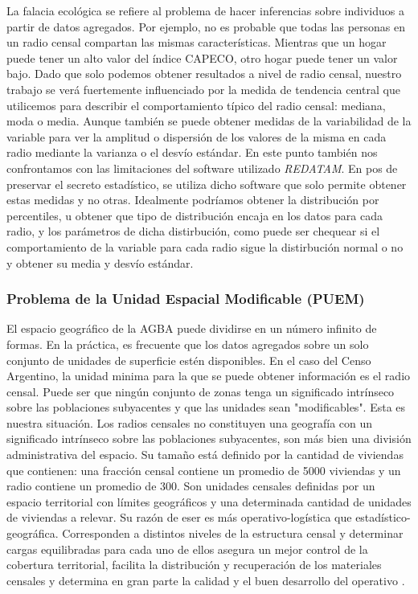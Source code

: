 La falacia ecológica se refiere al problema de hacer inferencias sobre individuos a partir de datos agregados. Por ejemplo, no es probable que todas las personas en un radio censal compartan las mismas características. Mientras que un hogar puede tener un alto valor del índice CAPECO, otro hogar puede tener un valor bajo. Dado que solo podemos obtener resultados a nivel de radio censal, nuestro trabajo se verá fuertemente influenciado por la medida de tendencia central que utilicemos para describir el comportamiento típico del radio censal: mediana, moda o media. Aunque también se puede obtener medidas de la variabilidad de la variable para ver la amplitud o dispersión de los valores de la misma en cada radio mediante la varianza o el desvío estándar. En este punto también nos confrontamos con las limitaciones del software utilizado \textit{REDATAM}. En pos de preservar el secreto estadístico, se utiliza dicho software que solo permite obtener estas medidas y no otras. Idealmente podríamos obtener la distribución por percentiles, u obtener que tipo de distribución encaja en los datos para cada radio, y los parámetros de dicha distirbución, como puede ser chequear si el comportamiento de la variable para cada radio sigue la distirbución normal o no y obtener su media y desvío estándar. 

	
	\subsubsection{Problema   de   la   Unidad   Espacial   Modificable   (PUEM)}
	
El espacio geográfico de la AGBA puede dividirse en un número infinito de formas. En la práctica, es frecuente que los datos agregados sobre un solo conjunto de unidades de superficie estén disponibles. En el caso del Censo Argentino, la unidad minima para la que se puede obtener información es el radio censal. Puede ser que ningún conjunto de zonas tenga un significado intrínseco sobre las poblaciones subyacentes y que las unidades sean "modificables". Esta es nuestra situación. Los radios censales no constituyen una geografía con un significado intrínseco sobre las poblaciones subyacentes, son más bien una división administrativa del espacio. Su tamaño está definido por la cantidad de viviendas que contienen: una fracción censal contiene un promedio de 5000 viviendas y un radio contiene un promedio de 300. Son unidades censales definidas por un espacio territorial con límites geográficos y una determinada cantidad de unidades de viviendas a relevar. Su razón de eser es más operativo-logística que estadístico-geográfica. Corresponden a distintos niveles de la estructura censal y determinar cargas equilibradas para cada uno de ellos asegura un mejor control de la cobertura territorial, facilita la distribución y recuperación de los materiales censales y determina en gran parte la calidad y el buen desarrollo del operativo \cite{ipec_a}.

